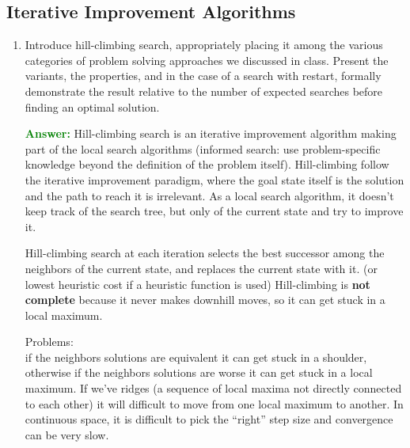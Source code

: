 \documentclass[12pt]{article}
\begin{document}
\subsection{Iterative Improvement Algorithms}\label{iterativeimprovement}
\begin{enumerate}[label=\textbf{IS.II.\arabic*}]
    \item Introduce hill-climbing search, appropriately placing it among the various categories of problem solving approaches we discussed in class.
    Present the variants, the properties, and in the case of a search with restart, formally demonstrate the result relative to the number of expected searches before finding an optimal solution.

    \textcolor{green}{\textbf{Answer:}}
    Hill-climbing search is an iterative improvement algorithm making part of the local search algorithms (informed search: use problem-specific knowledge beyond the definition of the problem itself).
    Hill-climbing follow the iterative improvement paradigm, where the goal state itself is the solution and the path to reach it is irrelevant.
    As a local search algorithm, it doesn't keep track of the search tree, but only of the current state and try to improve it.

    Hill-climbing search at each iteration selects the best successor among the neighbors of the current state, and replaces the current state with it.
    (or lowest heuristic cost if a heuristic function is used)
    Hill-climbing is \textbf{not complete} because it never makes downhill moves, so it can get stuck in a local maximum.

    Problems:\\
    if the neighbors solutions are equivalent it can get stuck in a shoulder, otherwise if the neighbors solutions are worse it can get stuck in a local maximum.
    If we've ridges (a sequence of local maxima not directly connected to each other) it will difficult to move from one local maximum to another.
    In continuous space, it is difficult to pick the ``right'' step size and convergence can be very slow.
    


\end{enumerate}
\end{document}
